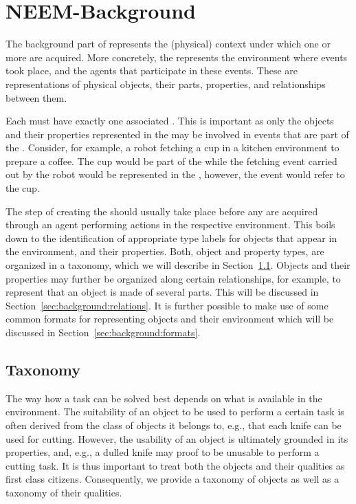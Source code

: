 
\chapter{NEEM-Background}
\label{ch:background}

The background part of \neems represents the (physical) context under which one or more \neems are acquired.
More concretely, the \neembak represents the environment where events took place, and the agents that participate in these events.
These are representations of physical objects, their parts, properties, and relationships between them.

Each \neem must have exactly one associated \neembak.
This is important as only the objects and their properties represented in the \neembak may be involved in events that are part of the \neem.
Consider, for example, a robot fetching a cup in a kitchen environment to prepare a coffee.
The cup would be part of the \neembak while the fetching event carried out by the robot would be represented in the \neemnar, however, the event would refer to the cup.

The step of creating the \neembak should usually take place before any \neems are acquired through an agent performing actions in the respective environment.
This boils down to the identification of appropriate type labels for objects that appear in the environment, and their properties.
Both, object and property types, are organized in a taxonomy, which we will describe in Section~\ref{sec:background:taxonomy}.
Objects and their properties may further be organized along certain relationships, for example, to represent that an object is made of several parts.
This will be discussed in Section~\ref{sec:background:relations}.
It is further possible to make use of some common formats for representing objects and their environment which will be discussed in Section~\ref{sec:background:formats}.
 
\section{Taxonomy}
\label{sec:background:taxonomy}

The way how a task can be solved best depends on what is available in the environment.
The suitability of an object to be used to perform a certain task is often derived from the class of objects it belongs to, e.g., that each knife can be used for cutting.
However, the usability of an object is ultimately grounded in its properties, and, e.g., a dulled knife may proof to be unusable to perform a cutting task.
It is thus important to treat both the objects and their qualities as first class citizens.
Consequently, we provide a taxonomy of objects as well as a taxonomy of their qualities.

